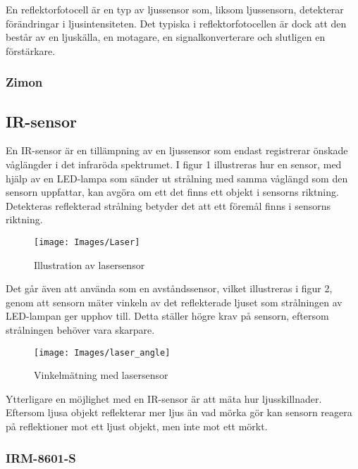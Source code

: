 \documentclass[11pt]{article}
\begin{document}
\begin{flushleft}
En reflektorfotocell är en typ av ljussensor som, liksom ljussensorn, detekterar förändringar i ljusintensiteten. Det typiska i reflektorfotocellen är dock att den  består av en ljuskälla, en motagare, en signalkonverterare och slutligen en förstärkare. 





\subsubsection{Zimon}


\subsection{IR-sensor}
En IR-sensor är en tillämpning av en ljussensor som endast registrerar önskade våglängder i det infraröda spektrumet. I figur 1 illustreras hur en sensor, med hjälp av en LED-lampa som sänder ut strålning med samma våglängd som den sensorn uppfattar, kan avgöra om ett det finns ett objekt i sensorns riktning. Detekteras reflekterad strålning betyder det att ett föremål finns i sensorns riktning.

\begin{figure}[htbp]
	\centering
	\texttt{[image: Images/Laser]}
	\caption{Illustration av lasersensor \label{Laser}}
\end{figure}

Det går även att använda som en avståndssensor, vilket illustreras i figur 2, genom att sensorn mäter vinkeln av det reflekterade ljuset som strålningen av LED-lampan ger upphov till. Detta ställer högre krav på sensorn, eftersom strålningen behöver vara skarpare.

\begin{figure}[htbp]
	\centering
	\texttt{[image: Images/laser\_angle]}
	\caption{Vinkelmätning med lasersensor \label{laser_angle}}
\end{figure}

Ytterligare en möjlighet med en IR-sensor är att mäta hur ljusskillnader. Eftersom ljusa objekt reflekterar mer ljus än vad mörka gör kan sensorn reagera på reflektioner mot ett ljust objekt, men inte mot ett mörkt.


\subsubsection{IRM-8601-S}



\end{flushleft}
\end{document}
